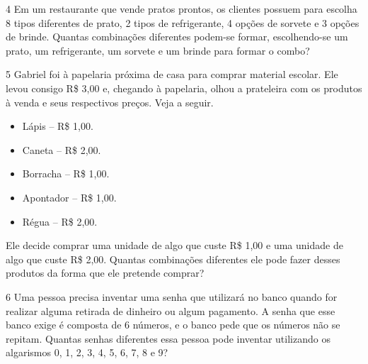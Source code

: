 \num{4} Em um restaurante que vende pratos prontos, os clientes possuem para
escolha 8 tipos diferentes de prato, 2 tipos de refrigerante, 4 opções
de sorvete e 3 opções de brinde. Quantas combinações diferentes podem-se
formar, escolhendo-se um prato, um refrigerante, um sorvete e um brinde para
formar o combo?

\begin{mdframed}[linewidth=2pt,linecolor=salmao,roundcorner=2pt]
\vspace{2cm}
\end{mdframed}

\num{5} Gabriel foi à papelaria próxima de casa para comprar material
escolar. Ele levou consigo R\$ 3,00 e, chegando à papelaria, olhou a
prateleira com os produtos à venda e seus respectivos preços. Veja a seguir.

\begin{itemize}
  \item Lápis -- R\$ 1,00.
  \item Caneta -- R\$ 2,00.
  \item Borracha -- R\$ 1,00.
  \item Apontador -- R\$ 1,00.
  \item Régua -- R\$ 2,00.
\end{itemize}

Ele decide comprar uma unidade de algo que custe R\$ 1,00 e uma unidade de
algo que custe R\$ 2,00. Quantas combinações diferentes ele pode fazer
desses produtos da forma que ele pretende comprar?

\begin{mdframed}[linewidth=2pt,linecolor=salmao,roundcorner=2pt]



\vspace{2cm}
\end{mdframed}

\num{6} Uma pessoa precisa inventar uma senha que utilizará no banco quando for
realizar alguma retirada de dinheiro ou algum pagamento. A senha que esse
banco exige é composta de 6 números, e o banco pede que os números
não se repitam. Quantas senhas diferentes essa pessoa pode inventar
utilizando os algarismos 0, 1, 2, 3, 4, 5, 6, 7, 8 e 9?


